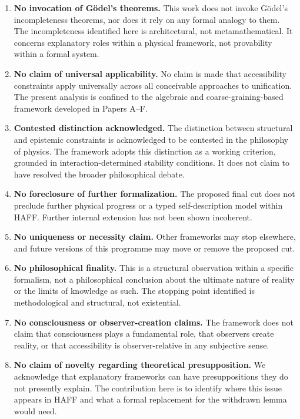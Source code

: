 \documentclass[12pt,a4paper]{article}
\begin{document}
\begin{enumerate}
    \item \textbf{No invocation of G\"{o}del's theorems.} This work does not invoke G\"{o}del's incompleteness theorems, nor does it rely on any formal analogy to them. The incompleteness identified here is architectural, not metamathematical. It concerns explanatory roles within a physical framework, not provability within a formal system.
    
    \item \textbf{No claim of universal applicability.} No claim is made that accessibility constraints apply universally across all conceivable approaches to unification. The present analysis is confined to the algebraic and coarse-graining-based framework developed in Papers A--F.
    
    \item \textbf{Contested distinction acknowledged.} The distinction between structural and epistemic constraints is acknowledged to be contested in the philosophy of physics. The framework adopts this distinction as a working criterion, grounded in interaction-determined stability conditions. It does not claim to have resolved the broader philosophical debate.
    
    \item \textbf{No foreclosure of further formalization.} The proposed final cut does not preclude further physical progress or a typed self-description model within HAFF.  Further internal extension has not been shown incoherent.
    
    \item \textbf{No uniqueness or necessity claim.} Other frameworks may stop elsewhere, and future versions of this programme may move or remove the proposed cut.
    
    \item \textbf{No philosophical finality.} This is a structural observation within a specific formalism, not a philosophical conclusion about the ultimate nature of reality or the limits of knowledge as such. The stopping point identified is methodological and structural, not existential.
    
    \item \textbf{No consciousness or observer-creation claims.} The framework does not claim that consciousness plays a fundamental role, that observers create reality, or that accessibility is observer-relative in any subjective sense.
    
    \item \textbf{No claim of novelty regarding theoretical presupposition.} We acknowledge that explanatory frameworks can have presuppositions they do not presently explain.  The contribution here is to identify where this issue appears in HAFF and what a formal replacement for the withdrawn lemma would need.
\end{enumerate}
\end{document}
